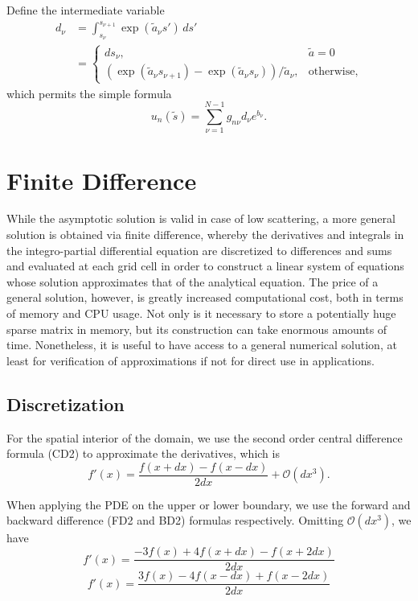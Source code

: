 \documentclass[ms,cpyr,lof,lot]{uathesis}
\begin{document}
Define the intermediate variable
\begin{align*}
  d_\nu &= \int_{s_\nu}^{s_{\nu+1}}  \exp\left(\tilde{a}_{\nu}s'\right)\, ds' \\
    &= \begin{cases}
    ds_\nu, & \tilde{a} = 0 \\
      \left( \exp(\tilde{a}_\nu s_{\nu+1}) - \exp(\tilde{a}_\nu s_\nu) \right)/\tilde{a}_\nu, & \mbox{otherwise},
    \end{cases}
\end{align*}
which permits the simple formula
\begin{equation}
  u_n(\tilde{s}) = \sum_{\nu=1}^{N-1} g_{n\nu}d_\nu e^{b_\nu}.
  \label{eqn:discrete_ray_integral}
\end{equation}

\section{Finite Difference}
While the asymptotic solution is valid in case of low scattering, a more general solution is obtained via finite difference, whereby the derivatives and integrals in the integro-partial differential equation are discretized to differences and sums and evaluated at each grid cell in order to construct a linear system of equations whose solution approximates that of the analytical equation.
The price of a general solution, however, is greatly increased computational cost, both in terms of memory and CPU usage.
Not only is it necessary to store a potentially huge sparse matrix in memory, but its construction can take enormous amounts of time.
Nonetheless, it is useful to have access to a general numerical solution, at least for verification of approximations if not for direct use in applications.

\subsection{Discretization}

For the spatial interior of the domain, we use the second order central difference formula (CD2) to approximate the derivatives, which is
\begin{equation*}
    \tag{CD2}
    f'(x) = \frac{f(x+dx)-f(x-dx)}{2dx} + \mathcal{O}(dx^3).
\end{equation*}

When applying the PDE on the upper or lower boundary, we use the forward and backward difference (FD2 and BD2) formulas respectively.
Omitting $\mathcal{O}(dx^3)$, we have
\begin{equation*}
    \tag{FD2}
    \label{eq:FD2}
    f'(x) = \frac{-3f(x)+4f(x+dx)-f(x+2dx)}{2dx}
\end{equation*}
\begin{equation*}
    \tag{BD2}
    \label{eq:BD2}
    f'(x) = \frac{3f(x)-4f(x-dx)+f(x-2dx)}{2dx}
\end{equation*}
\end{document}
